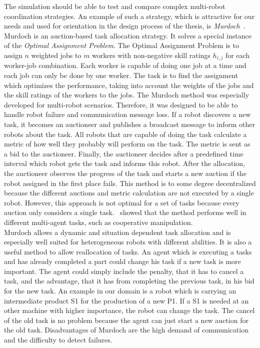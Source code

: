 The simulation should be able to test and compare complex multi-robot coordination strategies. An example of such a strategy, which is attractive for our needs and used for orientation in the design process of the thesis, is \textit{Murdoch}~\cite{DissMurdoch}. Murdoch is an auction-based task allocation strategy. It solves a special instance of the \textit{Optimal Assignment Problem}. The Optimal Assignment Problem is to assign $n$ weighted jobs to $m$ workers with non-negative skill ratings $h_{i,j}$ for each worker-job combination. Each worker is capable of doing one job at a time and each job can only be done by one worker. The task is to find the assignment which optimizes the performance, taking into account the weights of the jobs and the skill ratings of the workers to the jobs. The Murdoch method was especially developed 
for multi-robot scenarios. Therefore, it was designed to be able to handle robot failure and communication message loss. If a robot discovers a new task, it becomes an auctioneer and publishes a broadcast message to inform other robots about the task. All robots that are capable of doing the task calculate a metric of how well they probably will perform on the task. The metric is sent as a bid to the auctioneer. Finally, the auctioneer decides after a predefined time interval which robot gets the task and informs this robot. After the allocation, the auctioneer observes the progress of the task and starts a new auction if the robot assigned in the first place fails. This method is to some degree decentralized because the different auctions and metric calculation are not executed by a single robot. However, this approach is not optimal for a set of tasks because every auction only considers a single task. \cite{DissMurdoch}~showed that the method performs well in different multi-agent tasks, such as cooperative manipulation.\\
Murdoch allows a dynamic and situation dependent task allocation and is especially well suited for heterogeneous robots with different abilities. It is also a useful method to allow reallocation of tasks. An agent which is executing a tasks and has already completed a part could change his task if a new task is more important. The agent could simply include the penalty, that it has to cancel a task, and the advantage, that it has from completing the previous task, in his bid for the new task. An example in our domain is a robot which is carrying an intermediate product S1 for the production of a new P1. If a S1 is needed at an other machine with higher importance, the robot can change the task. The cancel of the old task is no problem because the agent can just start a new auction for the old task. Disadvantages of Murdoch are the high demand of communication and the difficulty to detect failures.
